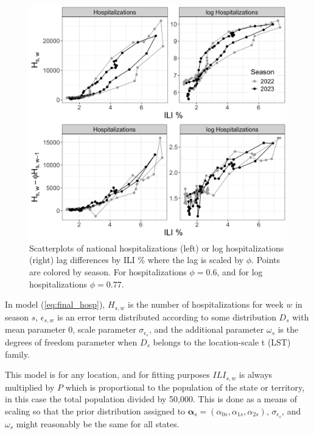 \begin{figure}[hbt!]
    \includegraphics[scale=.2]{Images/ili_v_svat_vs_lagdiff.png}
    \caption{Scatterplots of national hospitalizations (left) or log 
    hospitalizations (right) lag differences by ILI \% where the lag is 
    scaled by $\phi$. Points are colored by season. For hospitalizations 
    $\phi = 0.6$, and for log hospitalizations $\phi = 0.77$. }
    \label{fig:lag_scatter}
\end{figure}



In model (\ref{eq:final_hosp}), $H_{s,w}$ is the number of hospitalizations for 
week $w$ in season $s$, $\epsilon_{s,w}$ is an error term distributed 
according to some distribution $D_s$ with mean parameter 0, scale parameter 
$\sigma_{\epsilon_s}$, and the additional parameter $\omega_s$ is the degrees 
of freedom parameter when $D_s$ belongs to the location-scale t (LST) family.  



This model is for any location, and for fitting purposes $ILI_{s,w}$ is always 
multiplied by $P$ which is proportional to the population of the state or 
territory, in this case the total population divided by 50,000. This is done 
as a means of scaling so that the prior distribution assigned to  
$\boldsymbol{\alpha}_s = (\alpha_{0s}, \alpha_{1s}, \alpha_{2s})$, 
$\sigma_{\epsilon_s}$, and $\omega_s$ might reasonably be the same for all 
states.


